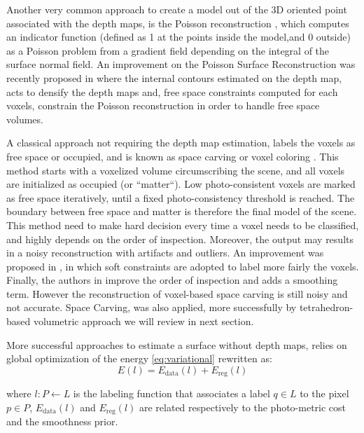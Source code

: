 Another very common approach to create a model out of the 3D oriented point associated with the depth maps, is the Poisson reconstruction \cite{kazhdan2006poisson}, which computes an indicator function (defined as 1 at the points inside the model,and 0  outside) as a Poisson problem from a gradient field depending on the integral of the surface normal field.
An improvement on the Poisson Surface Reconstruction was recently proposed in \cite{shan2014occluding} where the internal contours estimated on the depth map, acts to densify the depth maps and, free space constraints computed for each voxels, constrain the Poisson reconstruction in order to handle free space volumes.

A classical approach not requiring the depth map estimation, labels the voxels as free space or occupied, and is known as space carving or voxel coloring \cite{seitz1999photorealistic,kutulakos_seitz05}. 
This method starts with a voxelized volume circumscribing the scene, and all voxels are initialized as occupied (or ``matter``). Low photo-consistent voxels are marked as free space iteratively, until a fixed photo-consistency threshold is reached. The boundary between free space and matter is therefore the final model of the scene. 
This method need to make hard decision every time a voxel needs to be classified, and highly depends on the order of inspection. Moreover, the output may results in a noisy reconstruction with artifacts and outliers.
An improvement was proposed in \cite{broadhurst2001probabilistic}, in which soft constraints are adopted to label more fairly the voxels.
Finally, the authors in \cite{yang2003multi} improve the order of inspection and adds a smoothing term. 
However the reconstruction of voxel-based space carving is still noisy and not  accurate.
Space Carving, was also applied, more successfully by tetrahedron-based volumetric approach we will  review in next section.

More successful approaches to estimate a surface without depth maps, relies on global optimization of the energy \eqref{eq:variational} rewritten as:
\begin{equation}
\label{eq:eqVoxel}
E(\mathit{l}) = E_{\text{data}}(\mathit{l}) + E_{\text{reg}} (\mathit{l})  
\end{equation}


where $\mathit{l}:\mathit{P}\leftarrow \mathit{L}$ is the labeling function that associates a label $q\in \mathit{L}$ to the pixel $p \in\mathit{P}$, $E_{\text{data}}(\mathit{l})$ and $E_{\text{reg}} (\mathit{l})$ are related respectively to the photo-metric cost and the smoothness prior.

